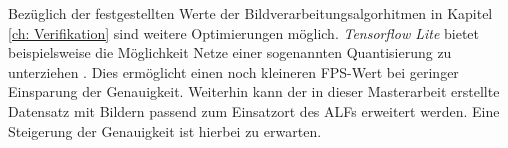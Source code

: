 Bezüglich der festgestellten Werte der Bildverarbeitungsalgorhitmen in Kapitel \ref{ch: Verifikation} sind weitere Optimierungen möglich. \textit{Tensorflow Lite} bietet beispielsweise die Möglichkeit Netze einer sogenannten Quantisierung zu unterziehen \cite{tflite}. Dies ermöglicht einen noch kleineren FPS-Wert bei geringer Einsparung der Genauigkeit. Weiterhin kann der in dieser Masterarbeit erstellte Datensatz mit Bildern passend zum Einsatzort des ALFs erweitert werden. Eine Steigerung der Genauigkeit ist hierbei zu erwarten.



